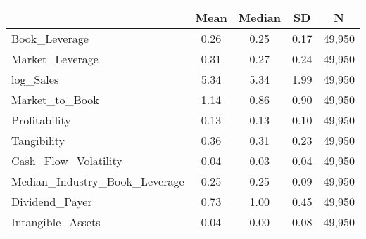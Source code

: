 {
\def\sym#1{\ifmmode^{#1}\else\(^{#1}\)\fi}
\begin{tabular}{l*{1}{cccc}}
\hline\hline
                    &        Mean&      Median&          SD&           N\\
\hline
Book\_Leverage       &        0.26&        0.25&        0.17&      49,950\\
Market\_Leverage     &        0.31&        0.27&        0.24&      49,950\\
log\_Sales           &        5.34&        5.34&        1.99&      49,950\\
Market\_to\_Book      &        1.14&        0.86&        0.90&      49,950\\
Profitability       &        0.13&        0.13&        0.10&      49,950\\
Tangibility         &        0.36&        0.31&        0.23&      49,950\\
Cash\_Flow\_Volatility&        0.04&        0.03&        0.04&      49,950\\
Median\_Industry\_Book\_Leverage&        0.25&        0.25&        0.09&      49,950\\
Dividend\_Payer      &        0.73&        1.00&        0.45&      49,950\\
Intangible\_Assets   &        0.04&        0.00&        0.08&      49,950\\
\hline\hline
\end{tabular}
}
